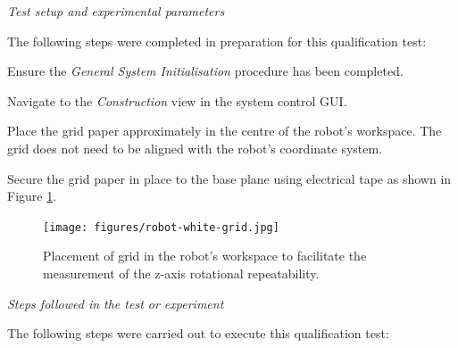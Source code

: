 \textit{Test setup and experimental parameters}

The following steps were completed in preparation for this qualification test:

\begin{compactenum}
	\item Ensure the \textit{General System Initialisation} procedure has been completed.
	\item Navigate to the \textit{Construction} view in the system control GUI.
	\item Place the grid paper approximately in the centre of the robot's workspace. The grid does not need to be aligned with the robot's coordinate system.
	\item Secure the grid paper in place to the base plane using electrical tape as shown in Figure \ref{fig:qtp5-orientation-grid}.
\end{compactenum}

\begin{figure}[!ht]
	\centering
	\texttt{[image: figures/robot-white-grid.jpg]}
	\caption{Placement of grid in the robot's workspace to facilitate the measurement of the z-axis rotational repeatability.}
	\label{fig:qtp5-orientation-grid}
\end{figure}

\textit{Steps followed in the test or experiment}

The following steps were carried out to execute this qualification test:


